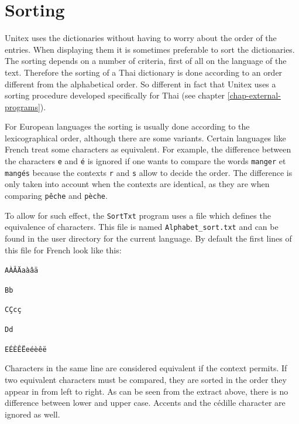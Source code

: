 \section{Sorting}

Unitex uses the dictionaries without having to worry about the order of the
entries. When displaying them it is sometimes preferable to sort the
dictionaries. The sorting depends on a number of criteria, first of all on the
language of the text. Therefore the sorting of a Thai dictionary is done
according to an order different from the alphabetical order.  So different in
fact that Unitex uses a sorting procedure developed specifically for Thai (see
chapter \ref{chap-external-programs}).

\bigskip
\noindent For European languages the sorting is usually done according to the
lexicographical order, although there are some variants. Certain languages like
French treat some characters as equivalent. For example, the difference between
the characters  \verb+e+  and \texttt{\'e}  is ignored if one wants to compare
the words \verb+manger+ et \texttt{mang\'es} because the contexts
\verb+r+ and \verb+s+ allow to decide the order. The difference is only taken 
into account when the contexts are
identical, as they are when comparing \texttt{p\^eche} and
\texttt{p\`eche}.

\bigskip {}
\noindent
To allow for such effect, the \verb+SortTxt+ program  
 uses a file which
defines the equivalence of characters.   This file
is named \verb+Alphabet_sort.txt+  and can
be found in the user directory for the current language. By default the first
lines of this file for French look like this:

\bigskip
\noindent
\texttt{A\`A\^A\"Aa\`a\^a\"a}

\noindent
\texttt{Bb}

\noindent
\texttt{C\c{C}c\c{c}}

\noindent
\texttt{Dd}

\noindent
\texttt{E\'E\`E\^E\"Ee\'e\`e\^e\"e}


\bigskip
\noindent Characters in the same line are considered equivalent if the context permits. If
two equivalent characters must be compared, they are sorted in the order they
appear in from left to right. As can be seen from the extract above, there is no
difference between lower and upper case. Accents and the c\'edille character are
ignored as well.

